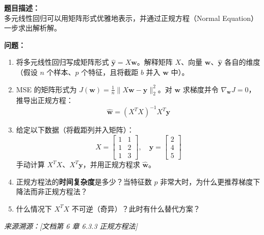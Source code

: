 \documentclass[a4paper,11pt]{ctexart}
\begin{document}
\begin{problembox}
    \textbf{题目描述：}\\
    多元线性回归可以用矩阵形式优雅地表示，并通过正规方程（Normal Equation）一步求出解析解。

    \vspace{0.2cm}
    \textbf{问题：}
    \begin{enumerate}[(1)]
        \item 将多元线性回归写成矩阵形式 $\hat{\boldsymbol{y}} = X\boldsymbol{w}$。解释矩阵 $X$、向量 $\boldsymbol{w}$、$\hat{\boldsymbol{y}}$ 各自的维度（假设 $n$ 个样本、$p$ 个特征，且将截距 $b$ 并入 $\boldsymbol{w}$ 中）。

        \item MSE 的矩阵形式为 $J(\boldsymbol{w}) = \frac{1}{n}\|X\boldsymbol{w}-\boldsymbol{y}\|_2^2$。对 $\boldsymbol{w}$ 求梯度并令 $\nabla_{\boldsymbol{w}}J=0$，推导出正规方程：
        \[
        \hat{\boldsymbol{w}} = (X^TX)^{-1}X^T\boldsymbol{y}
        \]

        \item 给定以下数据（将截距列并入矩阵）：
        \[
        X = \begin{bmatrix}1 & 1 \\ 1 & 2 \\ 1 & 3\end{bmatrix}, \quad \boldsymbol{y} = \begin{bmatrix}2 \\ 4 \\ 5\end{bmatrix}
        \]
        手动计算 $X^TX$、$X^T\boldsymbol{y}$，并用正规方程求 $\hat{\boldsymbol{w}}$。

        \item 正规方程法的\textbf{时间复杂度}是多少？当特征数 $p$ 非常大时，为什么更推荐梯度下降法而非正规方程法？

        \item 什么情况下 $X^TX$ 不可逆（奇异）？此时有什么替代方案？
    \end{enumerate}
    {\color{gray}\small\textit{来源溯源：[文档第 6 章 6.3.3 正规方程法]}}
\end{problembox}
\end{document}
